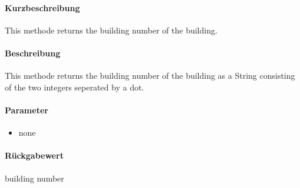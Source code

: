 \paragraph*{Kurzbeschreibung}
This methode returns the building number of the building.
\paragraph*{Beschreibung}
This methode returns the building number of the building as a String consisting of the two integers seperated by a dot.
\paragraph*{Parameter}
\begin{itemize}
    \item none
\end{itemize}
\paragraph*{Rückgabewert}
building number